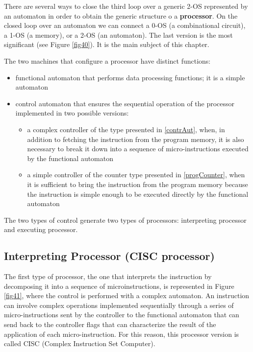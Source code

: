 There are several ways to close the third loop over a generic 2-OS represented by an automaton in order to obtain the generic structure o a {\bf processor}. On the closed loop over an automaton we can connect a 0-OS (a combinational circuit), a 1-OS (a memory), or a 2-OS (an automaton). The last version is the most significant (see Figure \ref{fig40}). It is the main subject of this chapter.

The two machines that configure a processor have distinct functions:


\begin{itemize}
    \item functional automaton that performs data processing functions; it is a simple automaton
    \item control automaton that ensures the sequential operation of the processor implemented in two possible versions:
        \begin{itemize}
            \item  a complex controller of the type presented in \ref{contrAut}, when, in addition to fetching the instruction from the program memory, it is also necessary to break it down into a sequence of micro-instructions executed by the functional automaton
            \item  a simple controller of the counter type presented in \ref{progCounter}, when it is sufficient to bring the instruction from the program memory because the instruction is simple enough to be executed directly by the functional automaton
        \end{itemize}
\end{itemize}

The two types of control generate two types of processors: interpreting processor and executing processor.

\subsection{Interpreting Processor (CISC processor)}

The first type of processor, the one that interprets the instruction by decomposing it into a sequence of microinstructions, is represented in Figure \ref{fig41}, where the control is performed with a complex automaton. An instruction can involve complex operations implemented sequentially through a series of micro-instructions sent by the controller to the functional automaton that can send back to the controller flags that can characterize the result of the application of each micro-instruction. For this reason, this processor version is called CISC (Complex Instruction Set Computer).

